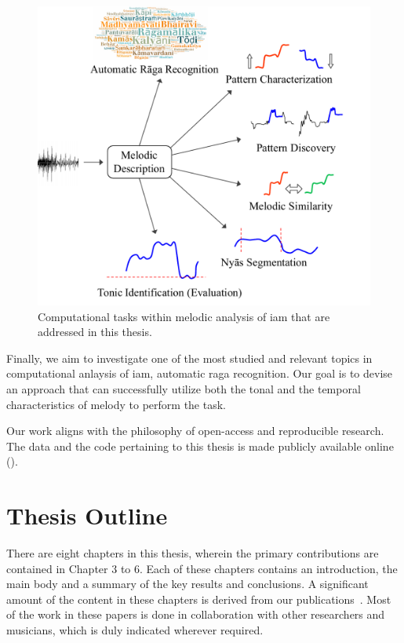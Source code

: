 \begin{figure}
	\begin{center}
		\includegraphics[width=\figSizeSeventyFive]{ch01_introduction/figures/tasks.pdf}
	\end{center}
	\caption[Computational melodic analyses addressed in this thesis]{Computational tasks within melodic analysis of \gls{iam} that are addressed in this thesis.}
	\label{fig:tasks}
\end{figure}

Finally, we aim to investigate one of the most studied and relevant topics in computational anlaysis of \gls{iam}, automatic \gls{raga} recognition. Our goal is to devise an approach that can successfully utilize both the tonal and the temporal characteristics of melody to perform the task. 

Our work aligns with the philosophy of open-access and reproducible research. The data and the code pertaining to this thesis is made publicly available online (). 

\section{Thesis Outline}
\label{sec:intro_thesis_outline}

There are eight chapters in this thesis, wherein the primary contributions are contained in Chapter 3 to 6. Each of these chapters contains an introduction, the main body and a summary of the key results and conclusions. A significant amount of the content in these chapters is derived from our publications~\cite{Gulati2014Tonic,gulati2014Landmark,gulati_SITIS_2014,gulati_ICASSP2015,gulati_ISMIR_2015,gulati_communities_2016,gulatiphrase_2016,gulati_tdms_2016}. Most of the work in these papers is done in collaboration with other researchers and musicians, which is duly indicated wherever required. 


